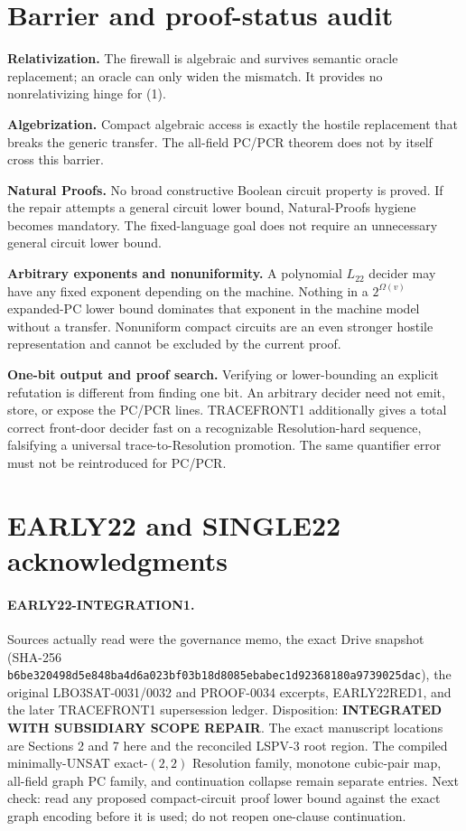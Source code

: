 \documentclass[11pt]{article}
\begin{document}
\section{Barrier and proof-status audit}
\textbf{Relativization.}  The firewall is algebraic and survives semantic
oracle replacement; an oracle can only widen the mismatch.  It provides no
nonrelativizing hinge for (1).

\textbf{Algebrization.}  Compact algebraic access is exactly the hostile
replacement that breaks the generic transfer.  The all-field PC/PCR theorem
does not by itself cross this barrier.

\textbf{Natural Proofs.}  No broad constructive Boolean circuit property is
proved.  If the repair attempts a general circuit lower bound, Natural-Proofs
hygiene becomes mandatory.  The fixed-language goal does not require an
unnecessary general circuit lower bound.

\textbf{Arbitrary exponents and nonuniformity.}  A polynomial $L_{22}$ decider
may have any fixed exponent depending on the machine.  Nothing in a
$2^{\Omega(v)}$ expanded-PC lower bound dominates that exponent in the
machine model without a transfer.  Nonuniform compact circuits are an even
stronger hostile representation and cannot be excluded by the current proof.

\textbf{One-bit output and proof search.}  Verifying or lower-bounding an
explicit refutation is different from finding one bit.  An arbitrary decider
need not emit, store, or expose the PC/PCR lines.  TRACEFRONT1 additionally
gives a total correct front-door decider fast on a recognizable
Resolution-hard sequence, falsifying a universal trace-to-Resolution
promotion.  The same quantifier error must not be reintroduced for PC/PCR.

\section{EARLY22 and SINGLE22 acknowledgments}
\paragraph{EARLY22-INTEGRATION1.}
Sources actually read were the governance memo, the exact Drive snapshot
(SHA-256 \texttt{b6be320498d5e848ba4d6a023bf03b18d8085ebabec1d92368180a9739025dac}),
the original LBO3SAT-0031/0032 and PROOF-0034 excerpts, EARLY22RED1, and the
later TRACEFRONT1 supersession ledger.  Disposition: \textbf{INTEGRATED WITH
SUBSIDIARY SCOPE REPAIR}.  The exact manuscript locations are Sections 2 and
7 here and the reconciled LSPV-3 root region.  The compiled minimally-UNSAT
exact-$(2,2)$ Resolution family, monotone cubic-pair map, all-field graph PC
family, and continuation collapse remain separate entries.  Next check:
read any proposed compact-circuit proof lower bound against the exact graph
encoding before it is used; do not reopen one-clause continuation.
\end{document}
